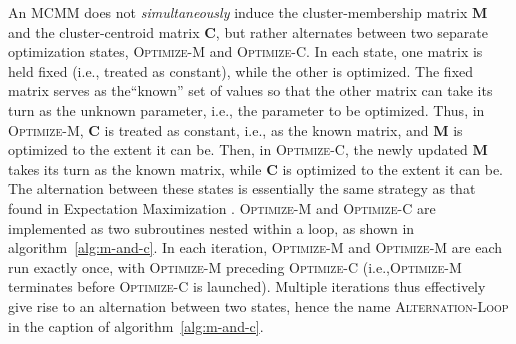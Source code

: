 An MCMM does not \emph{simultaneously} induce the 
cluster-membership matrix $\textbf{M}$ and the cluster-centroid matrix $\textbf{C}$,
but rather 
alternates between two separate optimization states, \textsc{Optimize-M} and \textsc{Optimize-C}. 
In each state, one matrix is held fixed (i.e., treated as constant), 
while the other is optimized. The fixed matrix serves as the``known'' set 
of values so that the other matrix can take its turn as the unknown 
parameter, i.e., the parameter to be optimized.
Thus, in \textsc{Optimize-M}, $\textbf{C}$ is treated as constant, i.e., 
as the known matrix, and $\textbf{M}$ is optimized to the extent it can be. 
Then, in \textsc{Optimize-C}, 
the newly updated $\textbf{M}$ takes its turn as the known matrix, 
while $\textbf{C}$ is optimized to the extent it can be. The alternation 
between these states is essentially the same strategy as that found in 
Expectation Maximization \citep{dempster-et-al:1977}.
\textsc{Optimize-M} and \textsc{Optimize-C} are implemented as two subroutines 
nested within a loop, as shown in algorithm~\ref{alg:m-and-c}. %
In each iteration, \textsc{Optimize-M}  and \textsc{Optimize-M} are each run exactly once, 
with \textsc{Optimize-M} preceding \textsc{Optimize-C} (i.e.,\textsc{Optimize-M} 
terminates before \textsc{Optimize-C} is launched). Multiple iterations thus effectively 
give rise to an alternation between two states, hence the name \textsc{Alternation-Loop} in the caption of algorithm~\ref{alg:m-and-c}.

